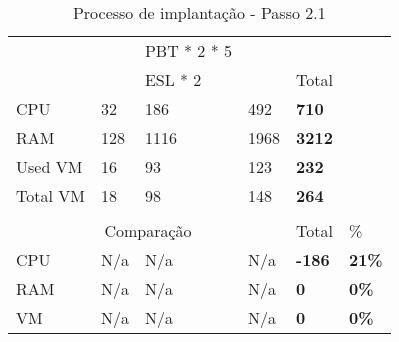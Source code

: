 \begin{table}[H]
\begin{tabular}{|l|l|l|l|l|l|}
                                     &                                             & \cellcolor[HTML]{A9D08E}PBT * 2 * 5        &              &                              & \\ \cline{1-5}
                                     &                                             & \cellcolor[HTML]{A9D08E}ESL * 2            & & Total & \\ \cline{1-5}
    \cellcolor[HTML]{C0C0C0}CPU      & 32                                          & 186                                        & 492                                          & \textbf{710}                 & \\ \cline{1-5}
    \cellcolor[HTML]{C0C0C0}RAM      & 128                                         & 1116                                       & 1968                                          & \textbf{3212}                & \\ \cline{1-5}
    \cellcolor[HTML]{C0C0C0}Used VM  & 16                                          & 93                                        & 123                                           & \textbf{232}                 & \\ \cline{1-5}
    \cellcolor[HTML]{C0C0C0}Total VM & 18                                          & 98                                        & 148                                           & \textbf{264}                 & \\ \cline{1-5}
      &                                              &                                              &               &               & \\ \cline{1-6}
    \multicolumn{4}{c}{\cellcolor[HTML]{C0C0C0}Comparação}                       & Total         & \%             \\ \cline{1-6}
    \cellcolor[HTML]{C0C0C0}CPU                             & N/a                                                    & N/a                                                    & N/a & \textbf{-186} & \textbf{21\%} \\ \cline{1-6}
    \cellcolor[HTML]{C0C0C0}RAM                             & N/a                                                    & N/a                                                    & N/a    & \textbf{0}    & \textbf{0\%} \\ \cline{1-6}
    \cellcolor[HTML]{C0C0C0}VM                              & N/a                                                    & N/a                                                    & N/a    & \textbf{0}    & \textbf{0\%} \\ \cline{1-6}
  \end{tabular}
  \caption{Processo de implantação - Passo 2.1}
  \label{tab:strat-2_1}
\end{table}

